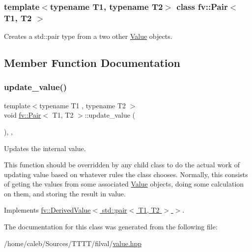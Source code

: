 \subsubsection*{template$<$typename T1, typename T2$>$\newline
class fv\+::\+Pair$<$ T1, T2 $>$}

Creates a std\+::pair type from a two other \hyperlink{classfv_1_1Value}{Value} objects. 

\subsection{Member Function Documentation}
\hypertarget{classfv_1_1Pair_ab3225f03f49240fc1547a5005f57b864}{}\label{classfv_1_1Pair_ab3225f03f49240fc1547a5005f57b864} 
\subsubsection{\texorpdfstring{update\+\_\+value()}{update\_value()}}
{\footnotesize\ttfamily template$<$typename T1 , typename T2 $>$ \\
void \hyperlink{classfv_1_1Pair}{fv\+::\+Pair}$<$ T1, T2 $>$\+::update\+\_\+value (\begin{DoxyParamCaption}{ }\end{DoxyParamCaption})\hspace{0.3cm}{\ttfamily [inline]}, {\ttfamily [protected]}, {\ttfamily [virtual]}}



Updates the internal value. 

This function should be overridden by any child class to do the actual work of updating value based on whatever rules the class chooses. Normally, this consists of geting the values from some associated \hyperlink{classfv_1_1Value}{Value} objects, doing some calculation on them, and storing the result in value. 

Implements \hyperlink{classfv_1_1DerivedValue_ae59e80a98eb74b95d8961bfe12ee5ec2}{fv\+::\+Derived\+Value$<$ std\+::pair$<$ T1, T2 $>$ $>$}.



The documentation for this class was generated from the following file\+:\begin{DoxyCompactItemize}
\item 
/home/caleb/\+Sources/\+T\+T\+T\+T/filval/\hyperlink{value_8hpp}{value.\+hpp}\end{DoxyCompactItemize}
